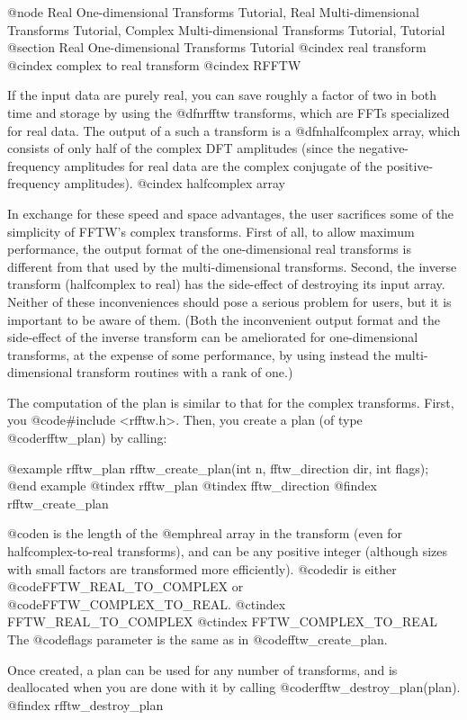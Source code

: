 @node Real One-dimensional Transforms Tutorial, Real Multi-dimensional Transforms Tutorial, Complex Multi-dimensional Transforms Tutorial, Tutorial
@section Real One-dimensional Transforms Tutorial
@cindex real transform
@cindex complex to real transform
@cindex RFFTW

If the input data are purely real, you can save roughly a factor of two
in both time and storage by using the @dfn{rfftw} transforms, which are
FFTs specialized for real data.  The output of a such a transform is a
@dfn{halfcomplex} array, which consists of only half of the complex DFT
amplitudes (since the negative-frequency amplitudes for real data are
the complex conjugate of the positive-frequency amplitudes).
@cindex halfcomplex array

In exchange for these speed and space advantages, the user sacrifices
some of the simplicity of FFTW's complex transforms.  First of all, to
allow maximum performance, the output format of the one-dimensional real
transforms is different from that used by the multi-dimensional
transforms.  Second, the inverse transform (halfcomplex to real) has the
side-effect of destroying its input array.  Neither of these
inconveniences should pose a serious problem for users, but it is
important to be aware of them.  (Both the inconvenient output format
and the side-effect of the inverse transform can be ameliorated for
one-dimensional transforms, at the expense of some performance, by using
instead the multi-dimensional transform routines with a rank of one.)

The computation of the plan is similar to that for the complex
transforms.  First, you @code{#include <rfftw.h>}.  Then, you create a
plan (of type @code{rfftw_plan}) by calling:

@example
rfftw_plan rfftw_create_plan(int n, fftw_direction dir, int flags);
@end example
@tindex rfftw_plan
@tindex fftw_direction
@findex rfftw_create_plan

@code{n} is the length of the @emph{real} array in the transform (even
for halfcomplex-to-real transforms), and can be any positive integer
(although sizes with small factors are transformed more efficiently).
@code{dir} is either @code{FFTW_REAL_TO_COMPLEX} or
@code{FFTW_COMPLEX_TO_REAL}.
@ctindex FFTW_REAL_TO_COMPLEX
@ctindex FFTW_COMPLEX_TO_REAL
The @code{flags} parameter is the same as in @code{fftw_create_plan}.

Once created, a plan can be used for any number of transforms, and is
deallocated when you are done with it by calling
@code{rfftw_destroy_plan(plan)}.
@findex rfftw_destroy_plan

